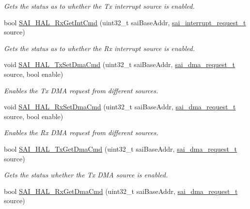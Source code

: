 \begin{DoxyCompactItemize}
\begin{DoxyCompactList}\small\item\em Gets the status as to whether the Tx interrupt source is enabled. \end{DoxyCompactList}\item 
bool \hyperlink{group__sai__hal_gac50de21649ab9e9b201245c84b9f551b}{S\+A\+I\+\_\+\+H\+A\+L\+\_\+\+Rx\+Get\+Int\+Cmd} (uint32\+\_\+t sai\+Base\+Addr, \hyperlink{group__sai__hal_ga9bdde8d5136f0ba14347482d291dcb4e}{sai\+\_\+interrupt\+\_\+request\+\_\+t} source)
\begin{DoxyCompactList}\small\item\em Gets the status as to whether the Rx interrupt source is enabled. \end{DoxyCompactList}\item 
void \hyperlink{group__sai__hal_ga0760eccbb4f0041bf4e78ebc3e8bd01c}{S\+A\+I\+\_\+\+H\+A\+L\+\_\+\+Tx\+Set\+Dma\+Cmd} (uint32\+\_\+t sai\+Base\+Addr, \hyperlink{group__sai__hal_gad39105ce78413d7c5c27ee1d56e6e003}{sai\+\_\+dma\+\_\+request\+\_\+t} source, bool enable)
\begin{DoxyCompactList}\small\item\em Enables the Tx D\+MA request from different sources. \end{DoxyCompactList}\item 
void \hyperlink{group__sai__hal_ga621923e1c01da8050a2fff25748457ef}{S\+A\+I\+\_\+\+H\+A\+L\+\_\+\+Rx\+Set\+Dma\+Cmd} (uint32\+\_\+t sai\+Base\+Addr, \hyperlink{group__sai__hal_gad39105ce78413d7c5c27ee1d56e6e003}{sai\+\_\+dma\+\_\+request\+\_\+t} source, bool enable)
\begin{DoxyCompactList}\small\item\em Enables the Rx D\+MA request from different sources. \end{DoxyCompactList}\item 
bool \hyperlink{group__sai__hal_ga329d2766b46c9213028b1e75cfef3580}{S\+A\+I\+\_\+\+H\+A\+L\+\_\+\+Tx\+Get\+Dma\+Cmd} (uint32\+\_\+t sai\+Base\+Addr, \hyperlink{group__sai__hal_gad39105ce78413d7c5c27ee1d56e6e003}{sai\+\_\+dma\+\_\+request\+\_\+t} source)
\begin{DoxyCompactList}\small\item\em Gets the status whether the Tx D\+MA source is enabled. \end{DoxyCompactList}\item 
bool \hyperlink{group__sai__hal_ga239c1f58571f9ae62d42af3394fc4ef3}{S\+A\+I\+\_\+\+H\+A\+L\+\_\+\+Rx\+Get\+Dma\+Cmd} (uint32\+\_\+t sai\+Base\+Addr, \hyperlink{group__sai__hal_gad39105ce78413d7c5c27ee1d56e6e003}{sai\+\_\+dma\+\_\+request\+\_\+t} source)

\end{DoxyCompactItemize}
